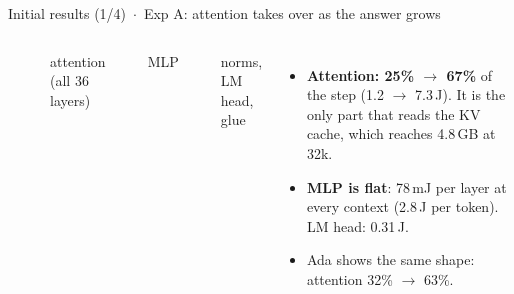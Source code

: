 \documentclass[aspectratio=169,9pt]{beamer}
\begin{document}
\begin{frame}{Initial results (1/4) \,$\cdot$\, Exp A: attention takes over as the answer grows}
\begin{columns}[T,onlytextwidth]
\\[1pt]
    {\tiny\textcolor{accent}{\rule{7pt}{6pt}} attention (all 36 layers) \quad\textcolor{mlp}{\rule{7pt}{6pt}} MLP \quad\textcolor{rule}{\rule{7pt}{6pt}} norms, LM head, glue\par}
    \raggedright
    \begin{itemize}\scriptsize
      \item \textbf{Attention: 25\% $\rightarrow$ 67\%} of the step (1.2 $\rightarrow$ 7.3\,J). It is the only part that reads the KV cache, which reaches 4.8\,GB at 32k.
      \item \textbf{MLP is flat}: 78\,mJ per layer at every context (2.8\,J per token). LM head: 0.31\,J.
      \item Ada shows the same shape: attention 32\% $\rightarrow$ 63\%.
    \end{itemize}
  \end{columns}
\end{frame}
\end{document}
